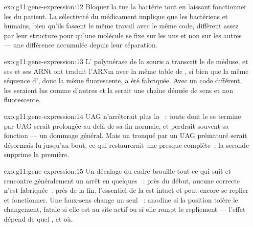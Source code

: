 \begin{solution}{exo:g11:gene-expression:12}
Bloquer la  tue la bactérie tout en laissant fonctionner les
 du patient. La sélectivité du médicament implique que les
 bactériens et humains, bien qu'ils fassent le même travail
avec le même code, diffèrent assez par leur structure pour qu'une
molécule se fixe sur les uns et non sur les autres --- une différence
accumulée depuis leur séparation.
\end{solution}

\begin{solution}{exo:g11:gene-expression:13}
L' polymérase de la souris a transcrit le  de méduse, et ses
 et ses ARNt ont traduit l'ARNm avec la même table de ,
si bien que la même séquence d', donc la même 
fluorescente, a été fabriquée. Avec un code différent, les 
seraient lus comme d'autres  et la  serait une
chaîne dénuée de sens et non fluorescente.
\end{solution}

\begin{solution}{exo:g11:gene-expression:14}
UAG n'arrêterait plus la ~: toute  dont le  se
termine par UAG serait prolongée au-delà de sa fin normale, et perdrait
souvent sa fonction --- un dommage général. Mais un  tronqué par un
UAG prématuré serait désormais lu jusqu'au bout, ce qui restaurerait
une  presque complète~: la seconde  supprime la
première.
\end{solution}

\begin{solution}{exo:g11:gene-expression:15}
Un décalage du cadre brouille tout ce qui suit et rencontre
généralement un arrêt en quelques ~: près du début, aucune
 correcte n'est fabriquée~; près de la fin, l'essentiel de la
 est intact et peut encore se replier et fonctionner. Une
 faux-sens change un seul ~: anodine si la position
tolère le changement, fatale si elle est au site actif ou si elle rompt
le repliement --- l'effet dépend de quel , et où.
\end{solution}

